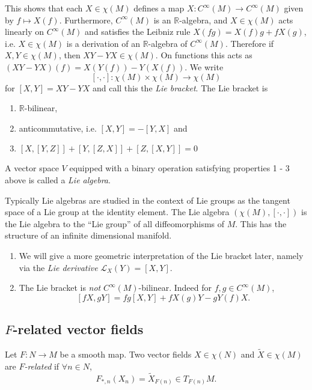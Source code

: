 This shows that each $X \in \chi(M)$ defines a map
$X: C^\infty(M) \to C^\infty(M)$ given by $f \mapsto X(f)$.
Furthermore, $C^\infty(M)$ is an $\mathbb{R}$-algebra, and
$X \in \chi(M)$ acts linearly on $C^\infty(M)$ and satisfies the
Leibniz rule $X(fg) = X(f) g + f X(g)$, i.e.
$X \in \chi(M)$ is a derivation of an $\mathbb{R}$-algebra of
$C^\infty(M)$. Therefore if $X, Y \in \chi(M)$, then
$XY - YX \in \chi(M)$. On functions this acts as
$(X Y - Y X)(f) = X(Y(f)) - Y(X(f))$. We write
$$
[ \cdot, \cdot ] : \chi(M) \times \chi(M) \to \chi(M)
$$
for $[X, Y] = XY - YX$ and call this the \emph{Lie bracket}.
The Lie bracket is
\begin{enumerate}
  \item{
    $\mathbb{R}$-bilinear,
  }
  \item{
    anticommutative, i.e. $[X, Y] = -[Y, X]$ and
  }
  \item{
    $[X, [Y, Z]] + [Y, [Z, X]] + [Z, [X, Y]] = 0$
  }
\end{enumerate}

\begin{defn}
A vector space $V$ equipped with a binary operation satisfying
properties 1 - 3 above is called a \emph{Lie algebra}.
\end{defn}

Typically Lie algebras are studied in the context of Lie groups as the
tangent space of a Lie group at the identity element. The Lie algebra
$(\chi(M), [\cdot, \cdot])$ is the Lie algebra to the ``Lie group'' of
all diffeomorphisms of $M$. This has the structure of an infinite
dimensional manifold.

\begin{remark}
  \begin{enumerate}
    \item{
      We will give a more geometric interpretation of the Lie bracket
      later, namely via the \emph{Lie derivative}
      $\mathcal{L}_X(Y) = [X, Y]$.
    }
    \item{
      The Lie bracket is \emph{not} $C^\infty(M)$-bilinear. Indeed for
      $f, g \in C^\infty(M)$,
      $$
      [fX, gY] = fg[X, Y] + f X(g) Y - g Y(f) X.
      $$
    }
  \end{enumerate}
\end{remark}

\subsection{$F$-related vector fields}
\begin{defn}
Let $F: N \to M$ be a smooth map. Two vector fields
$X \in \chi(N)$ and $\tilde{X} \in \chi(M)$ are
\emph{$F$-related} if $\forall n \in N$,
$$
F_{\ast, n}(X_n) = \tilde{X}_{F(n)} \in T_{F(n)} M.
$$
\end{defn}

